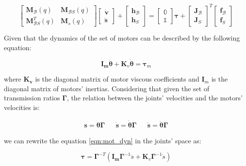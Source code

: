 $$
\begin{bmatrix}
\mathbf{M} _{\mathcal{B}}(q) & \mathbf{M} _{\mathcal{B}S}(q) \\
\mathbf{M} _{\mathcal{B}S} ^T(q) & \mathbf{M} _s(q) 
\end{bmatrix}
\begin{bmatrix}
\dot{\mathrm{\mathbf{v}}} \\
\ddot{\mathbf{s}}
\end{bmatrix}+
\begin{bmatrix}
\mathbf{h} _{\mathcal{B}} \\
\mathbf{h} _S
\end{bmatrix}=
\begin{bmatrix}
\mathbb{0} \\
\mathbb{1}
\end{bmatrix}
\boldsymbol{\tau}
+
\begin{bmatrix}
\mathbf{J} _{\mathcal{B}} \\
\mathbf{J} _S
\end{bmatrix} ^T
\begin{bmatrix}
\mathbf{f} _{\mathcal{B}} \\
\mathbf{f} _S
\end{bmatrix}
$$


Given that the dynamics of the set of motors can be described by the following equation:

\begin{equation}
    \label{eqn:mot_dyn}
\mathbf{I_m} \ddot{\boldsymbol{\theta}} + \mathbf{K}_v \dot{\boldsymbol{\theta}} = \boldsymbol{\tau}_m
\end{equation}

where $\mathbf{K _v}$ is the diagonal matrix of motor viscous coefficients and $\mathbf{I}_m$ is the diagonal matrix of motors' inertias. Considering that given the set of transmission ratios $\boldsymbol{\Gamma}$, the relation between the joints' velocities and the motors' velocities is:

\begin{align}
    \mathbf{s} = \boldsymbol{\theta} \boldsymbol{\Gamma} && \dot{\mathbf{s}} = \dot{\boldsymbol{\theta}} \boldsymbol{\Gamma} && \ddot{\mathbf{s}} = \ddot{\boldsymbol{\theta}} \boldsymbol{\Gamma}
\end{align}

we can rewrite the equation \ref{eqn:mot_dyn} in the joints' space as:

\begin{equation}
    \label{eqn:mot_dyn_jointspace}
\boldsymbol{\tau} = \boldsymbol{\Gamma} ^{-T} (\mathbf{I_m}\boldsymbol{\Gamma} ^{-1} \ddot{s} + \mathbf{K}_v \boldsymbol{\Gamma} ^{-1}\dot{s}) 
\end{equation}

